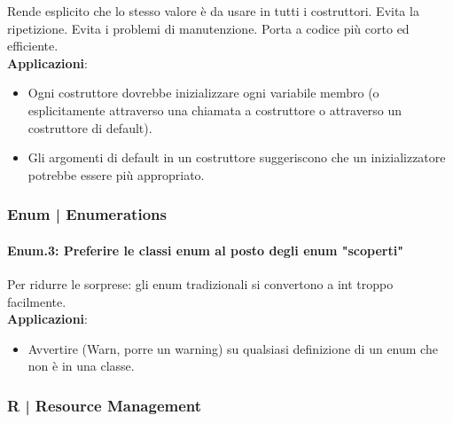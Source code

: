 \textsf{\small Rende esplicito che lo stesso valore è da usare in tutti i costruttori. Evita la ripetizione. Evita i problemi di manutenzione. Porta a codice più corto ed efficiente.} \\

\textsf{\small \textbf{Applicazioni}: }

\begin{itemize}
	\item \textsf{\small Ogni costruttore dovrebbe inizializzare ogni variabile membro (o esplicitamente attraverso una chiamata a costruttore o attraverso un costruttore di default).}
	\item \textsf{\small Gli argomenti di default in un costruttore suggeriscono che un inizializzatore potrebbe essere più appropriato.}
\end{itemize}


\subsubsection{Enum | Enumerations}

\paragraph{Enum.3: Preferire le classi enum al posto degli enum "scoperti"} %

\textsf{\small Per ridurre le sorprese: gli enum tradizionali si convertono a int troppo facilmente.} \\

\textsf{\small \textbf{Applicazioni}: }

\begin{itemize}
	\item \textsf{\small Avvertire (Warn, porre un warning) su qualsiasi definizione di un enum che non è in una classe.}
\end{itemize}


\newpage

\subsubsection{R | Resource Management}

